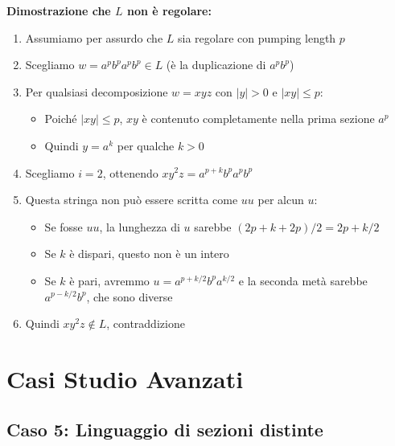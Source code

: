 \documentclass[12pt,a4paper]{article}
\begin{document}
\begin{risoluzione}
\textbf{Dimostrazione che $L$ non è regolare:}
\begin{enumerate}
    \item Assumiamo per assurdo che $L$ sia regolare con pumping length $p$
    \item Scegliamo $w = a^pb^pa^pb^p \in L$ (è la duplicazione di $a^pb^p$)
    \item Per qualsiasi decomposizione $w = xyz$ con $|y| > 0$ e $|xy| \leq p$:
    \begin{itemize}
        \item Poiché $|xy| \leq p$, $xy$ è contenuto completamente nella prima sezione $a^p$
        \item Quindi $y = a^k$ per qualche $k > 0$
    \end{itemize}
    \item Scegliamo $i = 2$, ottenendo $xy^2z = a^{p+k}b^pa^pb^p$
    \item Questa stringa non può essere scritta come $uu$ per alcun $u$:
    \begin{itemize}
        \item Se fosse $uu$, la lunghezza di $u$ sarebbe $(2p+k+2p)/2 = 2p+k/2$
        \item Se $k$ è dispari, questo non è un intero
        \item Se $k$ è pari, avremmo $u = a^{p+k/2}b^pa^{k/2}$ e la seconda metà sarebbe $a^{p-k/2}b^p$, che sono diverse
    \end{itemize}
    \item Quindi $xy^2z \not\in L$, contraddizione
\end{enumerate}
\end{risoluzione}

\section{Casi Studio Avanzati}

\subsection{Caso 5: Linguaggio di sezioni distinte}
\end{document}
